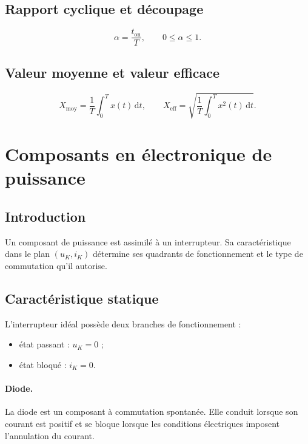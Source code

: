 \subsection{Rapport cyclique et découpage}
\[
\alpha=\frac{t_{\mathrm{on}}}{T},\qquad 0\leq\alpha\leq1.
\]
\begin{center}\TLChronogrammePWM\end{center}

\subsection{Valeur moyenne et valeur efficace}
\[
X_{\mathrm{moy}}=\frac1T\int_0^T x(t)\,\mathrm dt,
\qquad
X_{\mathrm{eff}}=\sqrt{\frac1T\int_0^T x^2(t)\,\mathrm dt}.
\]

\section{Composants en électronique de puissance}

\subsection{Introduction}
Un composant de puissance est assimilé à un interrupteur. Sa caractéristique dans le plan $(u_K,i_K)$ détermine ses quadrants de fonctionnement et le type de commutation qu'il autorise.

\subsection{Caractéristique statique}
L'interrupteur idéal possède deux branches de fonctionnement :
\begin{itemize}
\item état passant : $u_K=0$ ;
\item état bloqué : $i_K=0$.
\end{itemize}

\begin{center}
\end{center}

\paragraph{Diode.} La diode est un composant à commutation spontanée. Elle conduit lorsque son courant est positif et se bloque lorsque les conditions électriques imposent l'annulation du courant.

